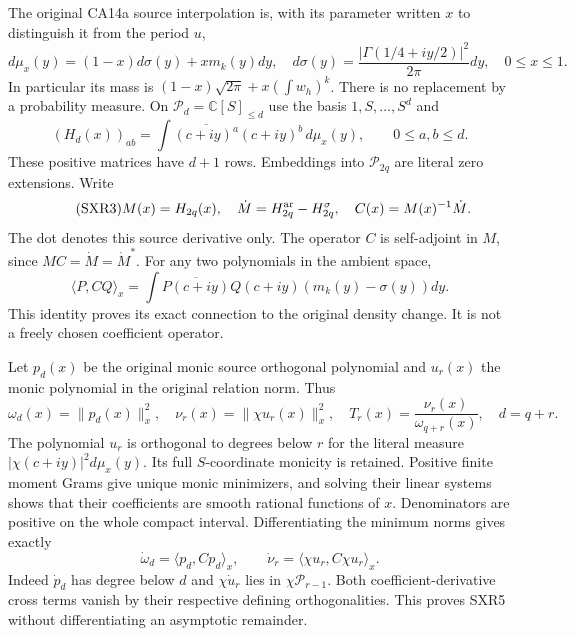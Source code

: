 The original CA14a source interpolation is, with its parameter written
$x$ to distinguish it from the period $u$,
\begin{equation}\tag{SXR2}
 d\mu_x(y)=(1-x)d\sigma(y)+x m_k(y)dy,\quad
 d\sigma(y)=\frac{|\Gamma(1/4+iy/2)|^2}{2\pi}dy,
 \quad 0\le x\le1.
\end{equation}
In particular its mass is
$(1-x)\sqrt{2\pi}+x(\int w_h)^k$. There is no replacement by
a probability measure. On $\mathcal P_d=\mathbb C[S]_{\le d}$
use the basis $1,S,\ldots,S^d$ and
\[
 (H_d(x))_{ab}=\int\overline{(c+iy)^a}(c+iy)^b\,d\mu_x(y),
 \qquad 0\le a,b\le d.
\]
These positive matrices have $d+1$ rows. Embeddings into
$\mathcal P_{2q}$ are literal zero extensions. Write
\begin{equation}\tag{SXR3}
 M(x)=H_{2q}(x),\quad \dot M=H_{2q}^{\rm ar}-H_{2q}^{\sigma},
 \quad C(x)=M(x)^{-1}\dot M.
\end{equation}
The dot denotes this source derivative only. The operator $C$ is
self-adjoint in $M$, since $MC=\dot M=\dot M^*$. For any two
polynomials in the ambient space,
\[
 \langle P,CQ\rangle_x
   =\int\overline{P(c+iy)}Q(c+iy)
                     (m_k(y)-\sigma(y))dy.
\]
This identity proves its exact connection to the original density
change. It is not a freely chosen coefficient operator.

Let $p_d(x)$ be the original monic source orthogonal polynomial and
$u_r(x)$ the monic polynomial in the original relation norm. Thus
\begin{equation}\tag{SXR4}
 \omega_d(x)=\|p_d(x)\|_x^2,\quad
 \nu_r(x)=\|\chi u_r(x)\|_x^2,\quad
 T_r(x)=\frac{\nu_r(x)}{\omega_{q+r}(x)},\quad d=q+r.
\end{equation}
The polynomial $u_r$ is orthogonal to degrees below $r$ for the
literal measure $|\chi(c+iy)|^2d\mu_x(y)$. Its full $S$-coordinate
monicity is retained. Positive finite moment Grams give unique monic
minimizers, and solving their linear systems shows that their
coefficients are smooth rational functions of $x$. Denominators
are positive on the whole compact interval. Differentiating the
minimum norms gives exactly
\begin{equation}\tag{SXR5}
 \dot\omega_d=\langle p_d,Cp_d\rangle_x,\qquad
 \dot\nu_r=\langle\chi u_r,C\chi u_r\rangle_x.
\end{equation}
Indeed $\dot p_d$ has degree below $d$ and $\chi\dot u_r$ lies
in $\chi\mathcal P_{r-1}$. Both coefficient-derivative cross terms
vanish by their respective defining orthogonalities. This proves
SXR5 without differentiating an asymptotic remainder.

